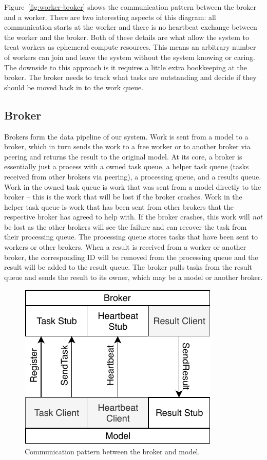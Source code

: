 \documentclass[conference]{IEEEtran}
\begin{document}
Figure~\ref{fig:worker-broker} shows the communication pattern between the
broker and a worker. There are two interesting aspects of this diagram: all
communication starts at the worker and there is no heartbeat exchange between
the worker and the broker. Both of these details are what allow the system to
treat workers as ephemeral compute resources. This means an arbitrary number of
workers can join and leave the system without the system knowing or caring. The
downside to this approach is it requires a little extra bookkeeping at the
broker. The broker needs to track what tasks are outstanding and decide if they
should be moved back in to the work queue.

\subsection{Broker}
Brokers form the data pipeline of our system. Work is sent from a model to a
broker, which in turn sends the work to a free worker or to another broker via
peering and returns the result to
the original model. At its core, a broker is essentially just a process with a
owned task queue, a helper task queue (tasks received from other brokers
via peering), a
processing queue, and a results queue. Work in the owned task queue is work that
was sent from a model directly to the broker -- this is the work that will be
lost if the broker crashes. Work in the helper task queue is work that has been
sent from other brokers that the respective broker has agreed to help with. If
the broker crashes, this work will \emph{not} be lost as the other brokers will
see the failure and can recover the task from their processing queue. The
processing queue stores tasks that have been sent to workers or other
brokers. When a result is received from a worker or another broker, the
corresponding ID will be removed from the processing queue and the result will
be added to the result queue. The broker pulls tasks from the result queue and
sends the result to its owner, which may be a model or another broker.

\begin{figure}
  \centering
  \includegraphics{img/model_broker}
  \caption{Communication pattern between the broker and
    model.}\label{fig:broker-model}
\end{figure}
\end{document}
